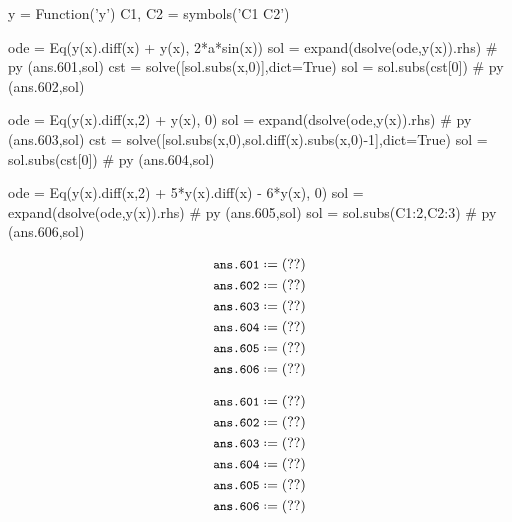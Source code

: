 \documentclass[12pt]{pylatex}
\begin{document}
\begin{minipage}[t]{0.70\textwidth}
\begin{python}
   y = Function('y')
   C1, C2 = symbols('C1 C2')

   ode = Eq(y(x).diff(x) + y(x), 2*a*sin(x))
   sol = expand(dsolve(ode,y(x)).rhs)                              # py (ans.601,sol)
   cst = solve([sol.subs(x,0)],dict=True)
   sol = sol.subs(cst[0])                                          # py (ans.602,sol)

   ode = Eq(y(x).diff(x,2) + y(x), 0)
   sol = expand(dsolve(ode,y(x)).rhs)                              # py (ans.603,sol)
   cst = solve([sol.subs(x,0),sol.diff(x).subs(x,0)-1],dict=True)
   sol = sol.subs(cst[0])                                          # py (ans.604,sol)

   ode = Eq(y(x).diff(x,2) + 5*y(x).diff(x) - 6*y(x), 0)
   sol = expand(dsolve(ode,y(x)).rhs)                              # py (ans.605,sol)
   sol = sol.subs({C1:2,C2:3})                                     # py (ans.606,sol)
\end{python}
\end{minipage}
\hskip 1cm
\begin{minipage}[t]{0.30\textwidth}
\begin{latex}
   \begin{align*}
      &\py*{ans.601}\\
      &\py*{ans.602}\\
      &\py*{ans.603}\\
      &\py*{ans.604}\\
      &\py*{ans.605}\\
      &\py*{ans.606}
   \end{align*}
\end{latex}
\end{minipage}

\begin{align*}
   &\py*{ans.601}\\
   &\py*{ans.602}\\
   &\py*{ans.603}\\
   &\py*{ans.604}\\
   &\py*{ans.605}\\
   &\py*{ans.606}
\end{align*}
\end{document}
